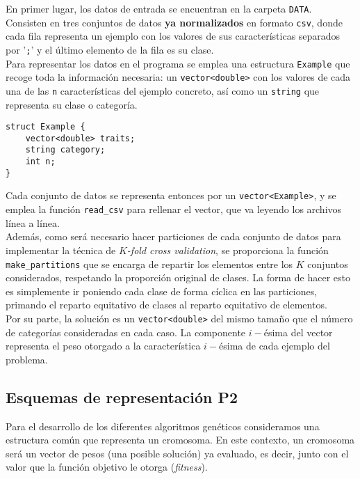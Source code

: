 \documentclass[12pt]{article}
\begin{document}
En primer lugar, los datos de entrada se encuentran en la carpeta \verb|DATA|. Consisten en tres conjuntos de datos \textbf{ya normalizados} en formato \verb|csv|, donde cada fila representa un ejemplo con los valores de sus características separados por '\verb|;|' y el último elemento de la fila es su clase.\\

Para representar los datos en el programa se emplea una estructura \verb|Example| que recoge toda la información necesaria: un \verb|vector<double>| con los valores de cada una de las \verb|n| características del ejemplo concreto, así como un \verb|string| que representa su clase o categoría.

\begin{verbatim}
struct Example {
    vector<double> traits;
    string category;
    int n;
}
\end{verbatim}

Cada conjunto de datos se representa entonces por un \verb|vector<Example>|, y se emplea la función \verb|read_csv| para rellenar el vector, que va leyendo los archivos línea a línea.\\ 

Además, como será necesario hacer particiones de cada conjunto de datos para implementar la técnica de \textit{$K$-fold cross validation}, se proporciona la función \verb|make_partitions| que se encarga de repartir los elementos entre los $K$ conjuntos considerados, respetando la proporción original de clases. La forma de hacer esto es simplemente ir poniendo cada clase de forma cíclica en las particiones, primando el reparto equitativo de clases al reparto equitativo de elementos.\\

Por su parte, la solución es un \verb|vector<double>| del mismo tamaño que el número de categorías consideradas en cada caso. La componente $i-$ésima del vector representa el peso otorgado a la característica $i-$ésima de cada ejemplo del problema.

\subsection*{Esquemas de representación P2}
\label{representacion}

Para el desarrollo de los diferentes algoritmos genéticos consideramos una estructura común que representa un cromosoma. En este contexto, un cromosoma será un vector de pesos (una posible solución) ya evaluado, es decir, junto con el valor que la función objetivo le otorga (\textit{fitness}).
\end{document}
